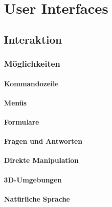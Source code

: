 \documentclass[a4paper, 11pt, accentcolor = tud3b]{tudreport}
\begin{document}
	\chapter{User Interfaces} %

		\section{Interaktion} %

			\subsection{Möglichkeiten} %

				\subsubsection{Kommandozeile} %

				\subsubsection{Menüs} %

				\subsubsection{Formulare} %

				\subsubsection{Fragen und Antworten} %

				\subsubsection{Direkte Manipulation} %

				\subsubsection{3D-Umgebungen} %

				\subsubsection{Natürliche Sprache} %
\end{document}
